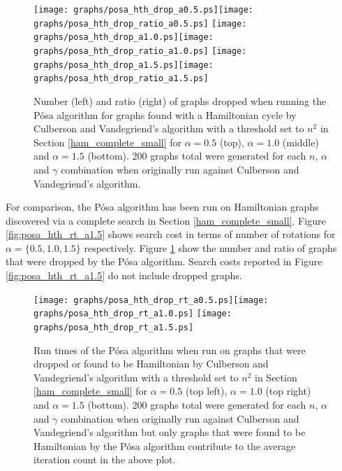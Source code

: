 \documentclass[twoside,11pt]{article}
\begin{document}
\begin{figure}
\centering
\texttt{[image: graphs/posa\_hth\_drop\_a0.5.ps]}\texttt{[image: graphs/posa\_hth\_drop\_ratio\_a0.5.ps]}
\texttt{[image: graphs/posa\_hth\_drop\_a1.0.ps]}\texttt{[image: graphs/posa\_hth\_drop\_ratio\_a1.0.ps]}
\texttt{[image: graphs/posa\_hth\_drop\_a1.5.ps]}\texttt{[image: graphs/posa\_hth\_drop\_ratio\_a1.5.ps]}
\caption{ 
  Number (left) and ratio (right) of graphs dropped when running the P\'osa algorithm for graphs found with a Hamiltonian cycle 
  by Culberson and Vandegriend's algorithm
  with a threshold set to $n^2$
  in Section \ref{ham_complete_small}
  for $\alpha = 0.5$ (top), $\alpha = 1.0$ (middle) and $\alpha = 1.5$ (bottom).
  200 graphs total were generated for each $n$, $\alpha$ and $\gamma$ combination when originally run against Culberson
  and Vandegriend's algorithm.
}
\label{fig:posa_hth_drop_a0.5}
\label{fig:posa_hth_drop_a1.0}
\label{fig:posa_hth_drop_a1.5}
\end{figure}

For comparison, the P\'osa algorithm has been run on Hamiltonian graphs discovered
via a complete search
in Section \ref{ham_complete_small}.  Figure
 \ref{fig:posa_hth_rt_a1.5} shows search cost in terms of number of rotations for $\alpha = \{ 0.5, 1.0, 1.5 \}$
respectively.
Figure  \ref{fig:posa_hth_drop_a1.5} show the number and ratio of graphs that were dropped by the P\'osa
algorithm.  Search costs reported in Figure  \ref{fig:posa_hth_rt_a1.5} do not include dropped graphs.




\begin{figure}
\centering
\texttt{[image: graphs/posa\_hth\_drop\_rt\_a0.5.ps]}\texttt{[image: graphs/posa\_hth\_drop\_rt\_a1.0.ps]}
\texttt{[image: graphs/posa\_hth\_drop\_rt\_a1.5.ps]}

\caption{ 
  Run times of the P\'osa algorithm when run on graphs that were dropped or found to be
  Hamiltonian 
  by Culberson and Vandegriend's algorithm
  with a threshold set to $n^2$
  in Section \ref{ham_complete_small}
  for $\alpha = 0.5$ (top left),  $\alpha = 1.0$ (top right) and $\alpha = 1.5$ (bottom).
  200 graphs total were generated for each $n$, $\alpha$ and $\gamma$ combination when originally run against Culberson
  and Vandegriend's algorithm but only graphs that were found to be Hamiltonian 
  by the P\'osa algorithm
  contribute to the average iteration
  count in the above plot. 
}
\label{fig:posa_hth_drop_rt_a0.5}
\label{fig:posa_hth_drop_rt_a1.0}
\label{fig:posa_hth_drop_rt_a1.5}

\end{figure}
\end{document}
